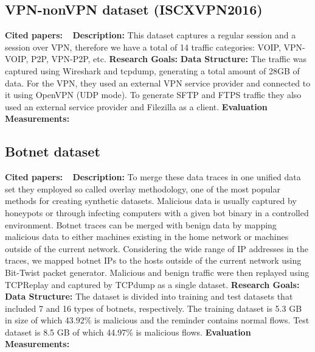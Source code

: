 \subsection{VPN-nonVPN dataset (ISCXVPN2016)}
\textbf{Cited papers:} ~\cite{draper2016characterization}\newline
\textbf{Description:} This dataset captures a regular session and a session over VPN, therefore we have a total of 14 traffic categories: VOIP, VPN-VOIP, P2P, VPN-P2P, etc.\newline
\textbf{Research Goals:}  \newline
\textbf{Data Structure:} The traffic was captured using Wireshark and tcpdump, generating a total amount of 28GB of data. For the VPN, they used an external VPN service provider and connected to it using OpenVPN (UDP mode). To generate SFTP and FTPS traffic they also used an external service provider and Filezilla as a client.\newline
\textbf{Evaluation Measurements:} \newline



\subsection{Botnet dataset}
\textbf{Cited papers:} ~\cite{beigi2014towards}\newline
\textbf{Description:} To merge these data traces in one unified data set they employed so called overlay methodology, one of the most popular methods for creating synthetic datasets. Malicious data is usually captured by honeypots or through infecting computers with a given bot binary in a controlled environment. Botnet traces can be merged with benign data by mapping malicious data to either machines existing in the home network or machines outside of the current network. Considering the wide range of IP addresses in the traces, we mapped botnet IPs to the hosts outside of the current network using Bit-Twist packet generator. Malicious and benign traffic were then replayed using TCPReplay and captured by TCPdump as a single dataset. \newline
\textbf{Research Goals:}  \newline
\textbf{Data Structure:} The dataset is divided into training and test datasets that included 7 and 16 types of botnets, respectively. The training dataset is 5.3 GB in size of which 43.92\% is malicious and the reminder contains normal flows. Test dataset is 8.5 GB of which 44.97\% is malicious flows.\newline
\textbf{Evaluation Measurements:} \newline



